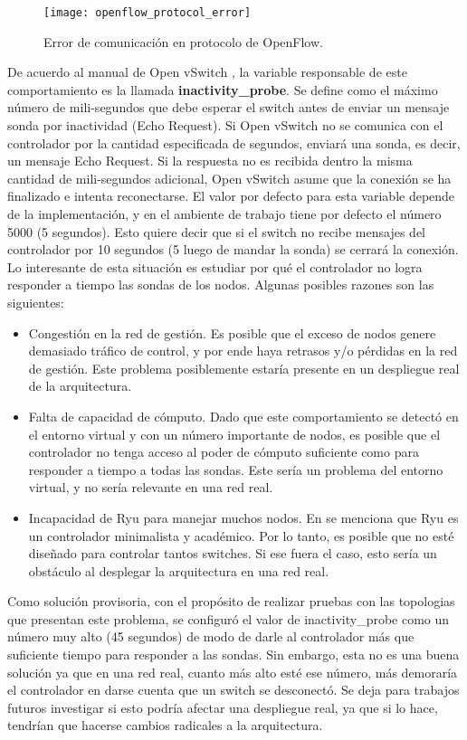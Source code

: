 \begin{figure}[t]
	\caption{Error de comunicación en protocolo de OpenFlow.}
	\texttt{[image: openflow\_protocol\_error]}
	\centering
	\label{fig:openflow_protocol_error}
\end{figure}
De acuerdo al manual de Open vSwitch \cite{ovs-vswitchd-conf}, la variable responsable de este comportamiento es la llamada \textbf{inactivity\_probe}. Se define como el máximo número de mili-segundos que debe esperar el switch antes de enviar un mensaje sonda por inactividad (Echo Request). Si Open vSwitch no se comunica con el controlador por la cantidad especificada de segundos, enviará una sonda, es decir, un mensaje Echo Request. Si la respuesta no es recibida dentro la misma cantidad de mili-segundos adicional, Open vSwitch asume que la conexión se ha finalizado e intenta reconectarse. El valor por defecto para esta variable depende de la implementación, y en el ambiente de trabajo tiene por defecto el número 5000 (5 segundos). Esto quiere decir que si el switch no recibe mensajes del controlador por 10 segundos (5 luego de mandar la sonda) se cerrará la conexión. \\
Lo interesante de esta situación es estudiar por qué el controlador no logra responder a tiempo las sondas de los nodos. Algunas posibles razones son las siguientes:
\begin{itemize}
	\item Congestión en la red de gestión. Es posible que el exceso de nodos genere demasiado tráfico de control, y por ende haya retrasos y/o pérdidas en la red de gestión. Este problema posiblemente estaría presente en un despliegue real de la arquitectura.
	\item Falta de capacidad de cómputo. Dado que este comportamiento se detectó en el entorno virtual y con un número importante de nodos, es posible que el controlador no tenga acceso al poder de cómputo suficiente como para responder a tiempo a todas las sondas. Este sería un problema del entorno virtual, y no sería relevante en una red real.
	\item Incapacidad de Ryu para manejar muchos nodos. En \cite{proyecto-rrap} se menciona que Ryu es un controlador minimalista y académico. Por lo tanto, es posible que no esté diseñado para controlar tantos switches. Si ese fuera el caso, esto sería un obstáculo al desplegar la arquitectura en una red real.
\end{itemize}
Como solución provisoria, con el propósito de realizar pruebas con las topologias que presentan este problema, se configuró el valor de inactivity\_probe como un número muy alto (45 segundos) de modo de darle al controlador más que suficiente tiempo para responder a las sondas. Sin embargo, esta no es una buena solución ya que en una red real, cuanto más alto esté ese número, más demoraría el controlador en darse cuenta que un switch se desconectó. Se deja para trabajos futuros investigar si esto podría afectar una despliegue real, ya que si lo hace, tendrían que hacerse cambios radicales a la arquitectura.

